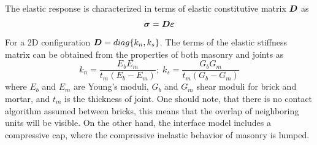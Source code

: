 \documentclass[a4paper]{article}
\newcommand{\mbf}[1]{\mbox{\boldmath$#1$}}
\newcommand{\del}[2]{\mbox{$\displaystyle\frac{#1}{#2}$}}
\newcommand{\e}{\mbf{\varepsilon}}
\newcommand{\sig}{\mbf{\sigma}}
\begin{document}
The elastic response is characterized in terms of elastic constitutive matrix $\mbf{D}$ as
\begin{equation}
  \sig=\mbf{D}\e
\end{equation}
For a 2D configuration $\mbf{D}=diag\{k_n,k_s\}$. The terms of the elastic stiffness matrix can be obtained from the properties of both masonry and joints as
\begin{equation}
  k_n=\del{E_bE_m}{t_m(E_b-E_m)};\;k_s=\del{G_bG_m}{t_m(G_b-G_m)}
\end{equation}
where $E_b$ and $E_m$ are Young's moduli, $G_b$ and $G_m$ shear moduli for brick and mortar, and $t_m$ is the thickness of joint. One should note, that there is no contact algorithm assumed between bricks, this means that the overlap of neighboring units will be visible. On the other hand, the interface model includes a compressive cap, where the compressive inelastic behavior of masonry is lumped.
\end{document}
